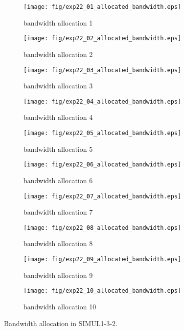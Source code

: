 	\begin{figure}
		\begin{center}
			\begin{subfigure}[b]{0.32\textwidth}
				\texttt{[image: fig/exp22\_01\_allocated\_bandwidth.eps]}
				\caption{bandwidth allocation 1}
				\label{figure:simul1_3_2_b_a}
			\end{subfigure}
			\begin{subfigure}[b]{0.32\textwidth}
				\texttt{[image: fig/exp22\_02\_allocated\_bandwidth.eps]}
				\caption{bandwidth allocation 2}
				\label{figure:simul1_3_2_b_b}
			\end{subfigure}
			\begin{subfigure}[b]{0.32\textwidth}
				\texttt{[image: fig/exp22\_03\_allocated\_bandwidth.eps]}
				\caption{bandwidth allocation 3}
				\label{figure:simul1_3_2_b_c}
			\end{subfigure}
			\begin{subfigure}[b]{0.32\textwidth}
				\texttt{[image: fig/exp22\_04\_allocated\_bandwidth.eps]}
				\caption{bandwidth allocation 4}
				\label{figure:simul1_3_2_b_d}
			\end{subfigure}
			\begin{subfigure}[b]{0.32\textwidth}
				\texttt{[image: fig/exp22\_05\_allocated\_bandwidth.eps]}
				\caption{bandwidth allocation 5}
				\label{figure:simul1_3_2_b_e}
			\end{subfigure}
			\begin{subfigure}[b]{0.32\textwidth}
				\texttt{[image: fig/exp22\_06\_allocated\_bandwidth.eps]}
				\caption{bandwidth allocation 6}
				\label{figure:simul1_3_2_b_f}
			\end{subfigure}
			\begin{subfigure}[b]{0.32\textwidth}
				\texttt{[image: fig/exp22\_07\_allocated\_bandwidth.eps]}
				\caption{bandwidth allocation 7}
				\label{figure:simul1_3_2_b_g}
			\end{subfigure}
			\begin{subfigure}[b]{0.32\textwidth}
				\texttt{[image: fig/exp22\_08\_allocated\_bandwidth.eps]}
				\caption{bandwidth allocation 8}
				\label{figure:simul1_3_2_b_h}
			\end{subfigure}
			\begin{subfigure}[b]{0.32\textwidth}
				\texttt{[image: fig/exp22\_09\_allocated\_bandwidth.eps]}
				\caption{bandwidth allocation 9}
				\label{figure:simul1_3_2_b_i}
			\end{subfigure}
			\begin{subfigure}[b]{0.32\textwidth}
				\texttt{[image: fig/exp22\_10\_allocated\_bandwidth.eps]}
				\caption{bandwidth allocation 10}
				\label{figure:simul1_3_2_b_j}
			\end{subfigure}
			\caption{Bandwidth allocation in SIMUL1-3-2.}
			\label{figure:simul1_3_2_ba}
		\end{center}
	\end{figure}
	
